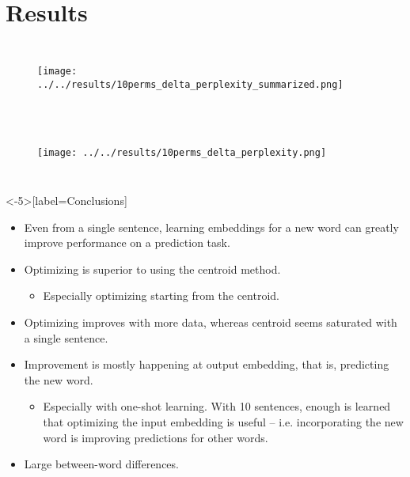 \documentclass{beamer}
\begin{document}
\section{Results}
\begin{frame}
  \begin{columns}
    \column{\dimexpr\paperwidth}
    \begin{figure}
    \texttt{[image: ../../results/10perms\_delta\_perplexity\_summarized.png]}
    \end{figure}
  \end{columns}
\begin{figure}
\end{figure}

\end{frame}
\begin{frame}
  \begin{columns}
    \column{\dimexpr\paperwidth}
    \begin{figure}
    \texttt{[image: ../../results/10perms\_delta\_perplexity.png]}
    \end{figure}
  \end{columns}
\begin{figure}
\end{figure}
\end{frame}

\begin{frame}<-5>[label=Conclusions]
\begin{itemize}
    \item<1-5, 6-> Even from a single sentence, learning embeddings for a new word can greatly improve performance on a prediction task.
    \item<2-5, 7-> Optimizing is superior to using the centroid method.
    \begin{itemize}
	\item<3-5, 8-> Especially optimizing starting from the centroid.
    \end{itemize}
    \item<4-5, 9-> Optimizing improves with more data, whereas centroid seems saturated with a single sentence.
    \item<10-> Improvement is mostly happening at output embedding, that is, predicting the new word.
    \begin{itemize}
	\item<11-> Especially with one-shot learning. With 10 sentences, enough is learned that optimizing the input embedding is useful -- i.e. incorporating the new word is improving predictions for other words. 
    \end{itemize}
    \item<12-> Large between-word differences. 
\end{itemize}
\end{frame}
\end{document}
